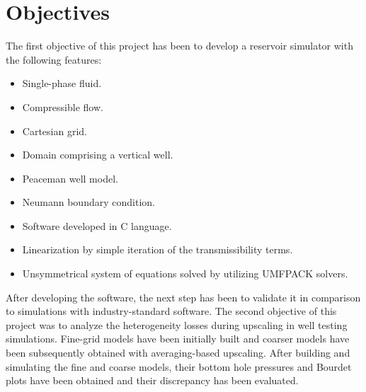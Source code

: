 \chapter{Objectives}
The first objective of this project has been to develop a reservoir simulator with the following features:

\begin{itemize}
	\item Single-phase fluid.
	\item Compressible flow.
	\item Cartesian grid.
	\item Domain comprising a vertical well.
	\item Peaceman well model.
	\item Neumann boundary condition.
	\item Software developed in C language.
	\item Linearization by simple iteration of the transmissibility terms.
	\item Unsymmetrical system of equations solved by utilizing UMFPACK solvers.
\end{itemize}

After developing the software, the next step has been to validate it in comparison to simulations with industry-standard software. The second objective of this project was to analyze the heterogeneity losses during upscaling in well testing simulations. Fine-grid models have been initially built and coarser models have been subsequently obtained with averaging-based upscaling. After building and simulating the fine and coarse models, their bottom hole pressures and Bourdet plots have been obtained and their discrepancy has been evaluated.
